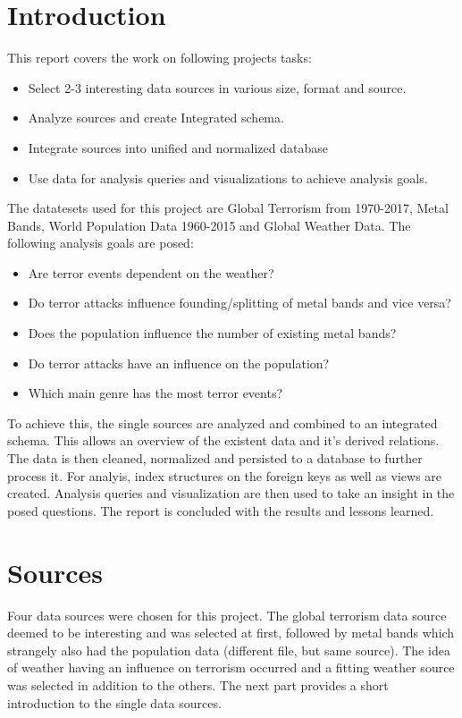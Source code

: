 \section{Introduction}
This report covers the work on following projects tasks:
\begin{itemize}
\item Select 2-3 interesting data sources in various size, format and source.
\item Analyze sources and create Integrated schema.
\item Integrate sources into unified and normalized database
\item Use data for analysis queries and visualizations to achieve analysis goals.
\end{itemize}
The datatesets used for this project are Global Terrorism from 1970-2017, Metal Bands, World Population Data 1960-2015 and Global Weather Data. The following analysis goals are posed:
\begin{itemize}
	\item Are terror events dependent on the weather?
	\item Do terror attacks influence founding/splitting of metal bands and vice versa?
	\item Does the population influence the number of existing metal bands?
	\item Do terror attacks have an influence on the population?
	\item Which main genre has the most terror events?
\end{itemize}
To achieve this, the single sources are analyzed and combined to an integrated schema. This allows an overview of the existent data and it's derived relations. The data is then cleaned, normalized and persisted to a database to further process it. For analyis, index structures on the foreign keys as well as views are created. Analysis queries and visualization are then used to take an insight in the posed questions. The report is concluded with the results and lessons learned.


\section{Sources}
Four data sources were chosen for this project. The global terrorism data source  deemed to be interesting and was selected at first, followed by metal bands which strangely also had the population data (different file, but same source). The idea of weather having an influence on terrorism occurred and a fitting weather source was selected in addition to the others. The next part provides a short introduction to the single data sources.

